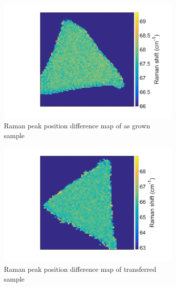 \begin{figure}[ht] %
	\begin{center}
		\begin{subfigure}[b]{0.4\textwidth}
			\includegraphics[scale=0.15]{Transfer/TransferRamanDiffMapAsgrown.png}
			\caption{Raman peak position difference map of as grown sample}
			\label{fig:TransferRamanDiffMapAsgrown}
		\end{subfigure}
		\quad
		\begin{subfigure}[b]{0.4\textwidth}
			\includegraphics[scale=0.15]{Transfer/TransferRamanDiffMapTransferred.png}
			\caption{Raman peak position difference map of transferred sample}
			\label{fig:TransferRamanDiffMapTransferred}
		\end{subfigure}
		\vfill
		\begin{subfigure}[b]{0.4\textwidth}

\end{subfigure}
\end{center}
\end{figure}
